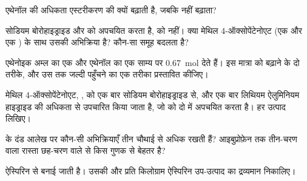\begin{exercise}[$\star$]\label{exo:g12:synthesis-strategy:4}
एथेनॉल की अधिकता एस्टरीकरण की  क्यों बढ़ाती है, जबकि
 नहीं बढ़ाता?
\end{exercise}

\begin{exercise}[$\star$]\label{exo:g12:synthesis-strategy:5}
सोडियम बोरोहाइड्राइड  और  को अपचयित करता है,  को नहीं। क्या
मेथिल 4-ऑक्सोपेंटेनोएट (एक  और एक ) के साथ उसकी अभिक्रिया
 है? कौन-सा समूह बदलता है?
\end{exercise}

\begin{exercise}[$\star\star$]\label{exo:g12:synthesis-strategy:6}
एथेनोइक अम्ल का एक  और एथेनॉल का एक  साम्य पर \qty{0.67}{mol}
 देते हैं। इस मात्रा को बढ़ाने के दो तरीके, और उस तक जल्दी पहुँचने का
एक तरीका प्रस्तावित कीजिए।
\end{exercise}

\begin{exercise}[$\star\star$]\label{exo:g12:synthesis-strategy:7}
मेथिल 4-ऑक्सोपेंटेनोएट, , को एक बार
सोडियम बोरोहाइड्राइड से, और एक बार लिथियम ऐलुमिनियम
हाइड्राइड की अधिकता से उपचारित किया जाता है, जो  को दो  में अपचयित करता है। हर उत्पाद लिखिए।
\end{exercise}

\begin{exercise}[$\star\star$]\label{exo:g12:synthesis-strategy:8}
 के दंड आलेख पर कौन-सी अभिक्रियाएँ तीन चौथाई से अधिक
 रखती हैं? आइबुप्रोफ़ेन तक तीन-चरण वाला रास्ता छह-चरण वाले से
किस गुणक से बेहतर है?
\end{exercise}

\begin{exercise}[$\star\star$]\label{exo:g12:synthesis-strategy:9}
ऐस्पिरिन  से बनाई जाती है। उसकी
 और प्रति किलोग्राम ऐस्पिरिन उप-उत्पाद का द्रव्यमान निकालिए।
\end{exercise}

